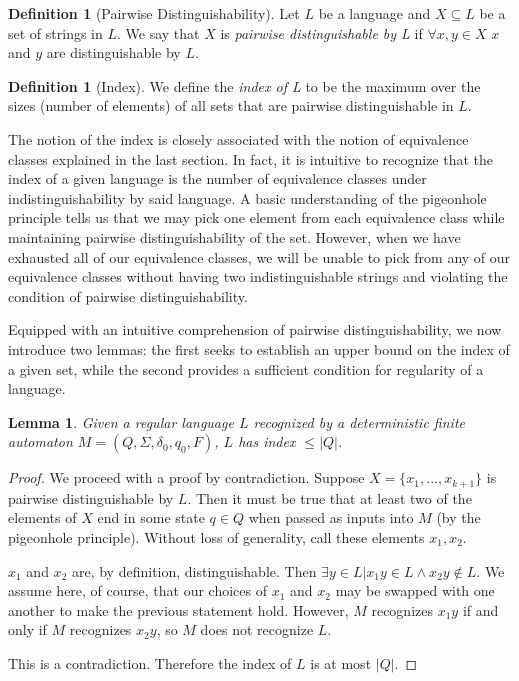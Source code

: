 \documentclass[12pt]{article}
\newtheorem{lemma}[theorem]{Lemma}
\theoremstyle{definition}
\newtheorem{definition}[theorem]{Definition}
\theoremstyle{remark}
\begin{document}
\begin{definition}[Pairwise Distinguishability]
Let $L$ be a language and $X \subseteq L$ be a set of strings in $L$. We say that $X$ is \emph{pairwise distinguishable by L} if $\forall x,y \in X$ $x$ and $y$ are distinguishable by $L$.
\end{definition}

\begin{definition}[Index]
We define the \emph{index of L} to be the maximum over the sizes (number of elements) of all sets that are pairwise distinguishable in $L$.
\end{definition}

The notion of the index is closely associated with the notion of equivalence classes explained in the last section. In fact, it is intuitive to recognize that the index of a given language is the number of equivalence classes under indistinguishability by said language. A basic understanding of the pigeonhole principle tells us that
we may pick one element from each equivalence class while maintaining pairwise distinguishability of the set. However, when we have exhausted all of our equivalence classes, we will be unable to pick from any of our equivalence classes without having two indistinguishable strings and violating the condition of pairwise
distinguishability.

Equipped with an intuitive comprehension of pairwise distinguishability, we now introduce two lemmas: the first seeks to establish an upper bound on the index of a given set, while the second provides a sufficient condition for regularity of a language.

\begin{lemma}
Given a regular language $L$ recognized by a deterministic finite automaton $M = (Q,\Sigma,\delta_0,q_0,F)$, $L$ has index $\leq |Q|$.
\end{lemma}

\begin{proof}
We proceed with a proof by contradiction. Suppose $X=\{x_1,...,x_{k+1}\}$ is pairwise distinguishable by $L$. Then it must be true that at least two of the elements of $X$ end in some state $q \in Q$ when passed as inputs into $M$ (by the pigeonhole principle). Without loss of generality, call these elements $x_1,x_2$.

$x_1$ and $x_2$ are, by definition, distinguishable. Then $\exists y \in L | x_1y \in L \wedge x_2y \notin L$. We assume here, of course, that our choices of $x_1$ and $x_2$ may be swapped with one another to make the previous statement hold. However, $M$ recognizes $x_1y$ if and only if $M$ recognizes $x_2y$, so
$M$ does not recognize $L$.

This is a contradiction. Therefore the index of $L$ is at most $|Q|$.
\end{proof}
\end{document}

